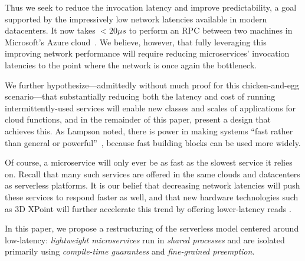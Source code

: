 Thus we seek to reduce the invocation latency and improve predictability, a
goal supported by the impressively low network latencies available in
modern datacenters. It
now takes $<20\mu{}s$ to perform an RPC between two machines in Microsoft's Azure
cloud~\cite{www-firestone-azure-latency}.    We believe, however, that fully leveraging this
improving network performance will require reducing microservices' invocation
latencies to the point where the network is once again the bottleneck.

We further hypothesize---admittedly without much proof for this chicken-and-egg
scenario---that substantially reducing both the latency and cost of running
intermittently-used services will enable new classes and scales of applications
for cloud functions, and in the remainder of this paper, present a design that
achieves this.  As Lampson noted, there is power in making systems 
``fast rather than general or powerful''~\cite{Lampson1983}, because fast
building blocks can be used more widely.

Of course, a microservice will only ever be as fast as the slowest service it relies
on.  Recall that many such services are offered in the same clouds and datacenters as
serverless platforms.  It is our belief that decreasing network latencies will push
these services to respond faster as well, and that new hardware technologies such as
3D XPoint will further accelerate this trend by offering lower-latency reads .

In this paper, we propose a restructuring of the serverless model centered around
low-latency: \textit{lightweight microservices} run in \textit{shared processes}
and are isolated primarily using \textit{compile-time guarantees} and
\textit{fine-grained preemption}.



